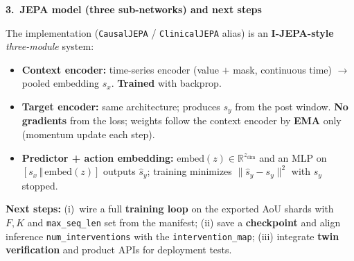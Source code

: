 \documentclass[10pt,a4paper]{article}
\newcommand{\sectiontitle}[1]{%
  \vspace{0.55em}\noindent\textbf{#1}\par\vspace{0.35em}}
\begin{document}
\sectiontitle{3.\ JEPA model (three sub-networks) and next steps}
The implementation (\texttt{CausalJEPA} / \texttt{ClinicalJEPA} alias) is an \textbf{I-JEPA-style}
\textit{three-module} system:

\begin{itemize}
  \item \textbf{Context encoder:} time-series encoder (value $+$ mask, continuous time) $\to$ pooled
        embedding $s_x$. \textbf{Trained} with backprop.
  \item \textbf{Target encoder:} same architecture; produces $s_y$ from the post window.
        \textbf{No gradients} from the loss; weights follow the context encoder by \textbf{EMA} only
        (momentum update each step).
  \item \textbf{Predictor + action embedding:} $\mathrm{embed}(z) \in \mathbb{R}^{z_{\mathrm{dim}}}$ and
        an MLP on $[s_x \,\Vert\, \mathrm{embed}(z)]$ outputs $\hat s_y$; training minimizes
        $\lVert \hat s_y - s_y \rVert^2$ with $s_y$ stopped.
\end{itemize}

\vspace{0.25em}
\noindent\textbf{Next steps:} (i)~wire a full \textbf{training loop} on the exported AoU shards with
$F,K$ and \texttt{max\_seq\_len} set from the manifest; (ii) save a \textbf{checkpoint} and align
inference \texttt{num\_interventions} with the \texttt{intervention\_map}; (iii) integrate
\textbf{twin verification} and product APIs for deployment tests.
\end{document}

